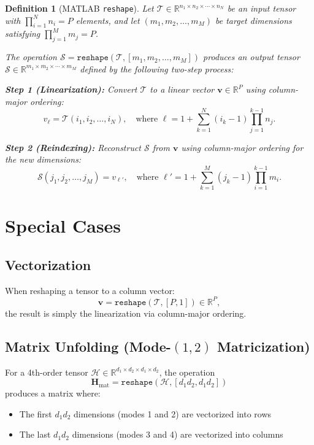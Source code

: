 \documentclass[11pt]{article}
\newtheorem{definition}{Definition}
\begin{document}
\begin{definition}[MATLAB \texttt{reshape}]
Let $\mathcal{T} \in \mathbb{R}^{n_1 \times n_2 \times \cdots \times n_N}$ be an input tensor with $\prod_{i=1}^{N} n_i = P$ elements, and let $(m_1, m_2, \ldots, m_M)$ be target dimensions satisfying $\prod_{j=1}^{M} m_j = P$.

The operation $\mathcal{S} = \texttt{reshape}(\mathcal{T}, [m_1, m_2, \ldots, m_M])$ produces an output tensor $\mathcal{S} \in \mathbb{R}^{m_1 \times m_2 \times \cdots \times m_M}$ defined by the following two-step process:

\textbf{Step 1 (Linearization):} Convert $\mathcal{T}$ to a linear vector $\bm{v} \in \mathbb{R}^P$ using column-major ordering:
\[
v_{\ell} = \mathcal{T}(i_1, i_2, \ldots, i_N), \quad \text{where } \ell = 1 + \sum_{k=1}^{N} (i_k - 1) \prod_{j=1}^{k-1} n_j.
\]

\textbf{Step 2 (Reindexing):} Reconstruct $\mathcal{S}$ from $\bm{v}$ using column-major ordering for the new dimensions:
\[
\mathcal{S}(j_1, j_2, \ldots, j_M) = v_{\ell'}, \quad \text{where } \ell' = 1 + \sum_{k=1}^{M} (j_k - 1) \prod_{i=1}^{k-1} m_i.
\]
\end{definition}

\section{Special Cases}

\subsection{Vectorization}

When reshaping a tensor to a column vector:
\[
\bm{v} = \texttt{reshape}(\mathcal{T}, [P, 1]) \in \mathbb{R}^P,
\]
the result is simply the linearization via column-major ordering.

\subsection{Matrix Unfolding (Mode-$(1,2)$ Matricization)}

For a 4th-order tensor $\mathcal{H} \in \mathbb{R}^{d_1 \times d_2 \times d_1 \times d_2}$, the operation
\[
\bm{H}_{\text{mat}} = \texttt{reshape}(\mathcal{H}, [d_1 d_2, d_1 d_2])
\]
produces a matrix where:
\begin{itemize}
    \item The first $d_1 d_2$ dimensions (modes 1 and 2) are vectorized into rows
    \item The last $d_1 d_2$ dimensions (modes 3 and 4) are vectorized into columns
\end{itemize}
\end{document}

